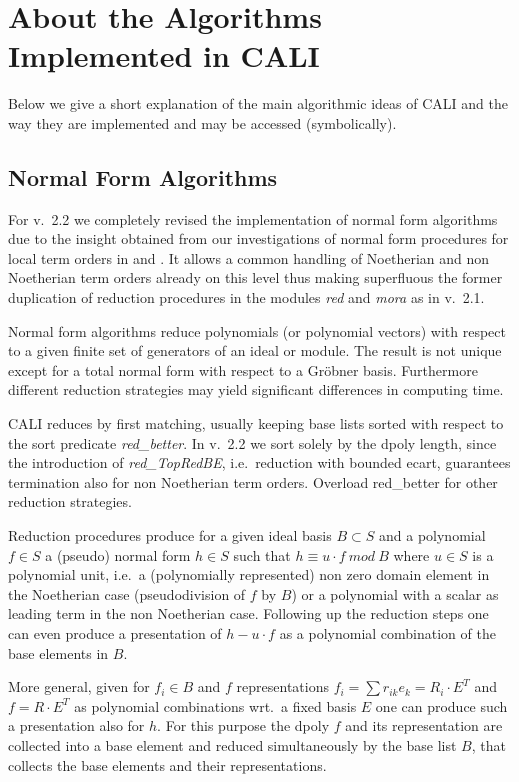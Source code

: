 \documentclass[a4paper,11pt]{article}
\newcommand{\gr}{Gr\"obner}
\newcommand{\ind}[1]{{\em #1}\index{#1}}
\begin{document}
\section{About the Algorithms Implemented in CALI}

Below we give a short explanation of the main algorithmic ideas of
CALI and the way they are implemented and may be accessed
(symbolically). 

\subsection{Normal Form Algorithms}

For v.\ 2.2 we completely revised the implementation of normal form
algorithms due to the insight obtained from our investigations of
normal form procedures for local term orders in \cite{ala} and
\cite{tcah}. It allows a common handling of Noetherian and non
Noetherian term orders already on this level thus making superfluous
the former duplication of reduction procedures in the modules {\em
red} and {\em mora} as in v.\ 2.1.
\medskip

Normal form algorithms reduce polynomials (or polynomial vectors)
with respect to a given finite set of generators of an ideal or
module. The result is not unique except for a total normal form with
respect to a {\gr} basis. Furthermore different reduction strategies
may yield significant differences in computing time.

CALI reduces by first matching, usually keeping base lists sorted
with respect to the sort predicate \ind{red\_better}. In v.\ 2.2 we
sort solely by the dpoly length, since the introduction of
\ind{red\_TopRedBE}, i.e.\ reduction with bounded ecart, guarantees
termination also for non Noetherian term orders. Overload red\_better
for other reduction strategies. 
\medskip

Reduction procedures produce for a given ideal basis $B\subset S$ and
a polynomial $f\in S$ a (pseudo) normal form $h\in S$ such that
$h\equiv u\cdot f\ mod\ B$ where $u\in S$ is a polynomial unit, i.e.\
a (polynomially represented) non zero domain element in the Noetherian
case (pseudodivision of $f$ by $B$) or a polynomial with a scalar as
leading term in the non Noetherian case. Following up the reduction
steps one can even produce a presentation of $h-u\cdot f$ as a
polynomial combination of the base elements in $B$.

More general, given for $f_i\in B$ and $f$ representations $f_i =
\sum{r_{ik}e_k} = R_i\cdot E^T$ and $f=R\cdot E^T$ as polynomial
combinations wrt.\ a fixed basis $E$ one can produce such a
presentation also for $h$. For this purpose the dpoly $f$ and its
representation are collected into a base element and reduced
simultaneously by the base list $B$, that collects the base elements
and their representations. 
\medskip
\end{document}
